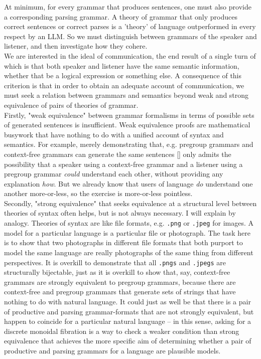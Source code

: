  At minimum, for every grammar that produces sentences, one must also provide a corresponding parsing grammar. A theory of grammar that only produces correct sentences or correct parses is a 'theory' of language outperformed in every respect by an LLM. So we must distinguish between grammars of the speaker and listener, and then investigate how they cohere.\\

 We are interested in the ideal of communication, the end result of a single turn of which is that both speaker and listener have the same semantic information, whether that be a logical expression or something else. A consequence of this criterion is that in order to obtain an adequate account of communication, we must seek a relation between grammars and semantics beyond weak and strong equivalence of pairs of theories of grammar.\\

Firstly, "weak equivalence" between grammar formalisms in terms of possible sets of generated sentences is insufficient. Weak equivalence proofs are mathematical busywork that have nothing to do with a unified account of syntax and semantics. For example, merely demonstrating that, e.g. pregroup grammars and context-free grammars can generate the same sentences [] only admits the possibility that a speaker using a context-free grammar and a listener using a pregroup grammar \emph{could} understand each other, without providing any explanation \emph{how}. But we already know that users of language \emph{do} understand one another more-or-less, so the exercise is more-or-less pointless.\\

Secondly, "strong equivalence" that seeks equivalence at a structural level between theories of syntax often helps, but is not always necessary. I will explain by analogy. Theories of syntax are like file formats, e.g. \texttt{.png} or \texttt{.jpeg} for images. A model for a particular language is a particular file or photograph. The task here is to show that two photographs in different file formats that both purport to model the same language are really photographs of the same thing from different perspectives. It is overkill to demonstrate that all \texttt{.pngs} and \texttt{.jpegs} are structurally bijectable, just as it is overkill to show that, say, context-free grammars are strongly equivalent to pregroup grammars, because there are context-free and pregroup grammars that generate sets of strings that have nothing to do with natural language. It could just as well be that there is a pair of productive and parsing grammar-formats that are not strongly equivalent, but happen to coincide for a particular natural language -- in this sense, asking for a discrete monoidal fibration is a way to check a weaker condition than strong equivalence that achieves the more specific aim of determining whether a pair of productive and parsing grammars for a language are plausible models.\\


